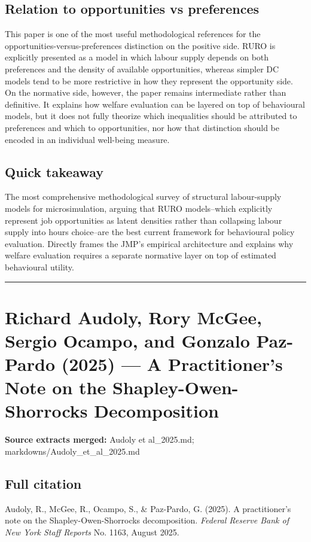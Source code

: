 \documentclass[11pt,a4paper]{article}
\begin{document}
\subsection*{Relation to opportunities vs preferences}
This paper is one of the most useful methodological references for the opportunities-versus-preferences distinction on the positive side. RURO is explicitly presented as a model in which labour supply depends on both preferences and the density of available opportunities, whereas simpler DC models tend to be more restrictive in how they represent the opportunity side. On the normative side, however, the paper remains intermediate rather than definitive. It explains how welfare evaluation can be layered on top of behavioural models, but it does not fully theorize which inequalities should be attributed to preferences and which to opportunities, nor how that distinction should be encoded in an individual well-being measure.

\subsection*{Quick takeaway}
The most comprehensive methodological survey of structural labour-supply models for microsimulation, arguing that RURO models--which explicitly represent job opportunities as latent densities rather than collapsing labour supply into hours choice--are the best current framework for behavioural policy evaluation. Directly frames the JMP's empirical architecture and explains why welfare evaluation requires a separate normative layer on top of estimated behavioural utility.


\medskip\hrule\medskip

\section*{Richard Audoly, Rory McGee, Sergio Ocampo, and Gonzalo Paz-Pardo (2025) — A Practitioner’s Note on the Shapley-Owen-Shorrocks Decomposition}

\textbf{Source extracts merged:} Audoly et al\_2025.md; markdowns/Audoly\_et\_al\_2025.md

\subsection*{Full citation}
Audoly, R., McGee, R., Ocampo, S., \& Paz-Pardo, G. (2025). A practitioner's note on the Shapley-Owen-Shorrocks decomposition. \textit{Federal Reserve Bank of New York Staff Reports} No. 1163, August 2025.
\end{document}
